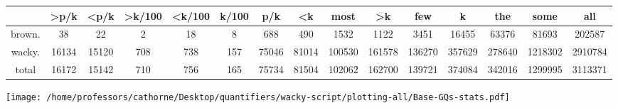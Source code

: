 \documentclass[a4,10pt]{article}
\begin{document}
\begin{sidewaystable}[p]
\tiny{\begin{tabular}{|c|c|c|c|c|c|c|c|c|c|c|c|c|c|c|}
 & >p/k & <p/k & >k/100 & <k/100 & k/100 & p/k & <k & most & >k & few & k & the & some & all\\
\hline
brown. & 38 & 22 & 2 & 18 & 8 & 688 & 490 & 1532 & 1122 & 3451 & 16455 & 63376 & 81693 & 202587\\
wacky. & 16134 & 15120 & 708 & 738 & 157 & 75046 & 81014 & 100530 & 161578 & 136270 & 357629 & 278640 & 1218302 & 2910784\\
\hline
total & 16172 & 15142 & 710 & 756 & 165 & 75734 & 81504 & 102062 & 162700 & 139721 & 374084 & 342016 & 1299995 & 3113371
\end{tabular}}
\end{sidewaystable}



\vspace{0.2cm}

\begin{center}
\texttt{[image: /home/professors/cathorne/Desktop/quantifiers/wacky-script/plotting-all/Base-GQs-stats.pdf]}
\end{center}
\end{document}

